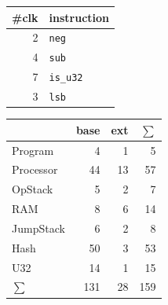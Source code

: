 \documentclass{article}
\begin{document}
\begin{minipage}[t][0.6\textheight][s]{0.3\textwidth}
    \vfill
    \begin{tabular}{rl}
        \toprule
        \#clk & instruction      \\ \midrule
            2 & \texttt{neg}     \\
            4 & \texttt{sub}     \\
            7 & \texttt{is\_u32} \\
            3 & \texttt{lsb}     \\ \bottomrule
    \end{tabular}
    \vspace*{3em}

    \begin{tabular}{lrrr}
        \toprule
                    & base & ext & $\sum$ \\ \midrule
        Program     &    4 &   1 &      5 \\
        Processor   &   44 &  13 &     57 \\
        OpStack     &    5 &   2 &      7 \\
        RAM         &    8 &   6 &     14 \\
        JumpStack   &    6 &   2 &      8 \\
        Hash        &   50 &   3 &     53 \\
        U32         &   14 &   1 &     15 \\ \bottomrule\bottomrule
        $\sum$      &  131 &  28 &    159
    \end{tabular}
\end{minipage}%
\hfill%
\end{document}
